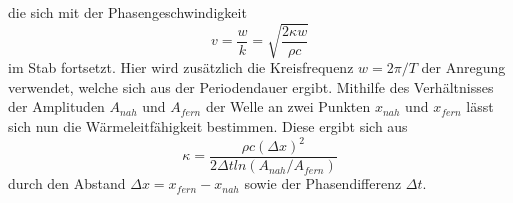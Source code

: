 die sich mit der Phasengeschwindigkeit
\begin{equation}
v=\frac{w}{k}=\sqrt{\frac{2\kappa w}{\rho c}}
\end{equation}
im Stab fortsetzt. Hier wird zusätzlich die Kreisfrequenz $w=2\pi /T$ der Anregung verwendet, welche sich aus der Periodendauer ergibt. Mithilfe des Verhältnisses der Amplituden $A_{nah}$ und $A_{fern}$ der Welle an zwei Punkten $x_{nah}$ und $x_{fern}$ lässt sich nun die Wärmeleitfähigkeit bestimmen. Diese ergibt sich aus 
\begin{equation}
\kappa=\frac{\rho c (\Delta x)^2}{2 \Delta t ln(A_{nah}/A_{fern})}
\end{equation}
durch den Abstand $\Delta x=x_{fern}-x_{nah}$ sowie der Phasendifferenz $\Delta t$.
